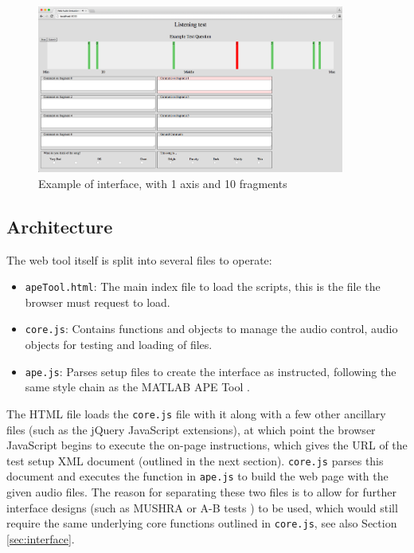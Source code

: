 \documentclass{article}
\begin{document}
\begin{figure}[htbp]
\begin{center}
\includegraphics[width=0.9\textwidth]{interface.png}
\caption{Example of interface, with 1 axis and 10 fragments}
\label{fig:interface}
\end{center}
\end{figure}



\subsection{Architecture}\label{sec:architecture}

The web tool itself is split into several files to operate:
\begin{itemize}
\item \texttt{apeTool.html}: The main index file to load the scripts, this is the file the browser must request to load. 
\item \texttt{core.js}: Contains functions and objects to manage the audio control, audio objects for testing and loading of files. 
\item \texttt{ape.js}: Parses setup files to create the interface as instructed, following the same style chain as the MATLAB APE Tool \cite{deman2014b}.
\end{itemize}

The HTML file loads the \texttt{core.js} file with it along with a few other ancillary files (such as the jQuery JavaScript extensions), at which point the browser JavaScript begins to execute the on-page instructions, which gives the URL of the test setup XML document (outlined in the next section). \texttt{core.js} parses this document and executes the function in \texttt{ape.js} to build the web page with the given audio files. The reason for separating these two files is to allow for further interface designs (such as MUSHRA \cite{mushra} or A-B tests \cite{bech}) to be used, which would still require the same underlying core functions outlined in \texttt{core.js}, see also Section \ref{sec:interface}.
\end{document}
